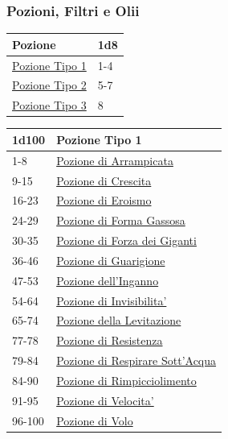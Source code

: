 \begin{multicols}{2}
{\subsubsection{Pozioni, Filtri e Olii}\hypertarget{pozionifiltri}{}\label{pozionifiltri}

{\small\begin{tabular}{ll}
		\toprule
\textbf{Pozione}&\textbf{1d8}\\
\toprule
\hyperlink{pozionifiltri}{Pozione Tipo 1} &1-4\\
\hyperlink{pozionifiltri}{Pozione Tipo 2} &5-7\\
\hyperlink{pozionifiltri}{Pozione Tipo 3} &8
\end{tabular}}

\medskip\hypertarget{Pozione Tipo 1}{}

{\small\begin{tabular}{ll}
		\toprule
\textbf{1d100} & \textbf{Pozione Tipo 1}\\
\toprule
1-8 & \hyperlink{Pozione di Arrampicata}{Pozione di Arrampicata}\\
9-15 & \hyperlink{Pozione di Crescita}{Pozione di Crescita}\\
16-23 & \hyperlink{Pozione di Eroismo}{Pozione di Eroismo}\\
24-29 & \hyperlink{Pozione di FormaGassosa}{Pozione di Forma Gassosa}\\
30-35 & \hyperlink{Pozione di ForzadeiGiganti}{Pozione di Forza dei Giganti}\\
36-46 & \hyperlink{Pozione di Guarigione}{Pozione di Guarigione}\\
47-53 & \hyperlink{Pozione dell'Inganno}{Pozione dell'Inganno}\\
54-64 & \hyperlink{Pozione di Invisibilita'}{Pozione di Invisibilita'}\\
65-74 & \hyperlink{Pozione della Levitazione}{Pozione della Levitazione}\\
77-78 & \hyperlink{Pozione di Resistenza}{Pozione di Resistenza}\\
79-84 & \hyperlink{Pozione di RespirareSott'Acqua}{Pozione di Respirare Sott'Acqua}\\
84-90 & \hyperlink{Pozione di Rimpicciolimento}{Pozione di Rimpicciolimento}\\
91-95 & \hyperlink{Pozione di Velocita'}{Pozione di Velocita'}\\
96-100 & \hyperlink{Pozione di Volo}{Pozione di Volo}
\end{tabular}}

}
\end{multicols}
